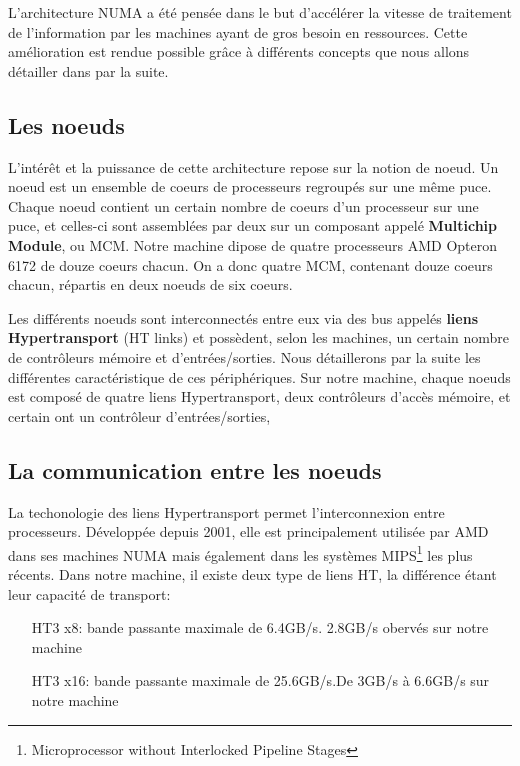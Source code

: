     L'architecture NUMA a été pensée dans le but d'accélérer la vitesse de
    traitement de l'information par les machines ayant de gros besoin en
    ressources. Cette amélioration est rendue possible grâce à différents
    concepts que nous allons détailler dans par la suite.

    \subsection{Les noeuds}

      L'intérêt et la puissance de cette architecture repose sur la notion de
      \og noeud\fg. Un noeud est un ensemble de coeurs de processeurs regroupés
      sur une même puce. Chaque noeud contient un certain nombre de coeurs d'un
      processeur sur une puce, et celles-ci sont assemblées par deux sur un
      composant appelé \textbf{Multichip Module}, ou MCM. Notre machine dipose
      de quatre processeurs AMD Opteron 6172 de douze coeurs chacun. On a donc
      quatre MCM, contenant douze coeurs chacun, répartis en deux noeuds de six
      coeurs.\newline

      Les différents noeuds sont interconnectés entre eux via des bus appelés
      \textbf{liens Hypertransport} (HT links) et possèdent, selon les machines,
      un certain nombre de contrôleurs mémoire et d'entrées/sorties. Nous
      détaillerons par la suite les différentes caractéristique de ces
      périphériques. Sur notre machine, chaque noeuds est composé de quatre
      liens Hypertransport, deux contrôleurs d'accès mémoire, et certain ont un
      contrôleur d'entrées/sorties,


    \subsection{La communication entre les noeuds}

      La techonologie des liens Hypertransport permet l'interconnexion entre
      processeurs. Développée depuis 2001, elle est principalement utilisée par
      AMD dans ses machines NUMA mais également dans les systèmes
      MIPS\footnote{Microprocessor without Interlocked Pipeline Stages} les plus
      récents. Dans notre machine, il existe deux type de liens HT, la
      différence étant leur capacité de transport:

      \begin{itemize}
        \item[HT3 x8:] bande passante maximale de 6.4GB/s. 2.8GB/s obervés sur
          notre machine\cite{Lepers2014}
        \item[HT3 x16:] bande passante maximale de 25.6GB/s.De 3GB/s à 6.6GB/s
          sur notre machine\cite{Lepers2014}
      \end{itemize}

